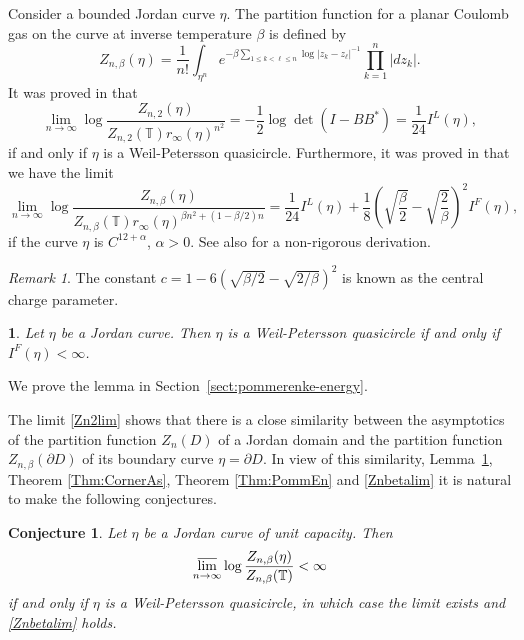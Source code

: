 \documentclass{article}
\numberwithin{equation}{section}
\numberwithin{figure}{section}
\theoremstyle{plain}
\theoremstyle{plain}
\newtheorem{lemma}[thm]{\protect\lemmaname}
\numberwithin{thm}{section}
\newtheorem{conjecture}[thm]{Conjecture}
\theoremstyle{remark}
\newtheorem*{rem}{Remark}
\providecommand{\lemmaname}{Lemma}
\newcommand{\T}{\mathbb{T}}
\let \le \leqslant
\begin{document}
Consider a bounded Jordan curve $\eta$. The partition function for a planar Coulomb gas on the curve at inverse temperature $\beta$ is defined by 
\begin{equation}\label{Partcurve}
    Z_{n,\beta}(\eta)=\frac 1{n!}\int_{\eta^n}e^{-\beta \sum_{1\le k < \ell\le n}\log|z_k-z_\ell|^{-1}}\prod_{k=1}^n|dz_k|.
\end{equation}
It was proved in \cite{Jo} that
\begin{equation}\label{Zn2lim}
    \lim_{n\to\infty}\log\frac{Z_{n,2}(\eta)}{Z_{n,2}(\T)r_\infty(\eta)^{n^2}}=-\frac 12\log\det(I-BB^*) = \frac{1}{24} I^L(\eta),
\end{equation}
if and only if $\eta$ is a Weil-Petersson quasicircle. Furthermore, it was proved in \cite{CoJo} that we have the limit
\begin{equation}\label{Znbetalim}
    \lim_{n\to\infty}\log \frac{Z_{n,\beta}(\eta)}{Z_{n,\beta}(\T)r_\infty(\eta)^{\beta n^2+(1-\beta/2)n}}=\frac{1}{24}I^L(\eta) +\frac{1}{8}\left(\sqrt{\frac{\beta}{2}}-\sqrt{\frac{2}{\beta}}\right)^2I^F(\eta),
\end{equation}
if the curve $\eta$ is $C^{12+\alpha}$, $\alpha>0$. 
See also \cite{WiZa} for a non-rigorous derivation. 
\begin{rem}The constant $c=1-6\left(\sqrt{\beta/2}-\sqrt{2/\beta}\right)^2$ is known as the central charge parameter.
\end{rem} 
\begin{lemma}\label{lemma:pommerenkewp}
    Let $\eta$ be a Jordan curve. Then $\eta$ is a Weil-Petersson quasicircle if and only if $I^F(\eta) < \infty$.
\end{lemma}
We prove the lemma in Section~\ref{sect:pommerenke-energy}.

The limit \eqref{Zn2lim} shows that there is a close similarity between the asymptotics of the partition function $Z_n(D)$ of a Jordan domain and the partition function $Z_{n,\beta}(\partial D)$ of its boundary curve $\eta=\partial D$. In view of this similarity, Lemma~\ref{lemma:pommerenkewp}, Theorem \ref{Thm:CornerAs}, Theorem \ref{Thm:PommEn} and \eqref{Znbetalim} it is natural to make the following conjectures.
\begin{conjecture}\label{Conj:discriminant}
Let $\eta$ be a Jordan curve of unit capacity. Then
\begin{align} \label{pommerenke-discriminant-conj}
\varlimsup_{n\to\infty}\log \frac{Z_{n,\beta}(\eta)}{Z_{n,\beta}(\T)} < \infty
\end{align}
if and only if $\eta$ is a Weil-Petersson quasicircle, in which case the limit exists and  \eqref{Znbetalim} holds. 
\end{conjecture}
\end{document}
